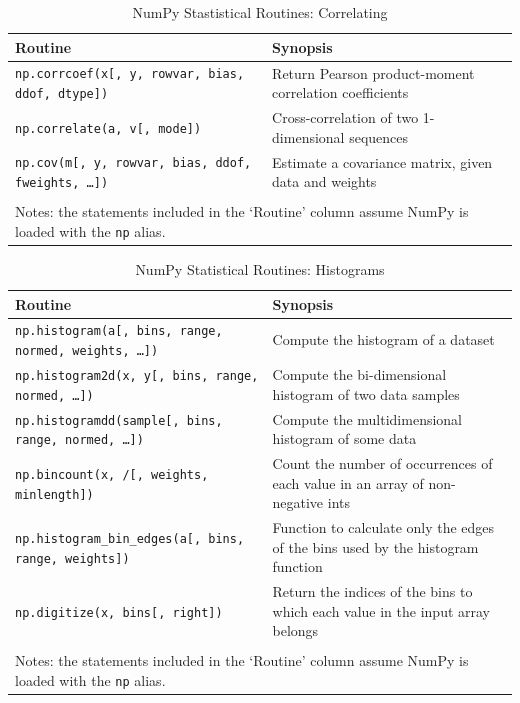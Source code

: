 \documentclass[a4paper,11pt]{book}
\begin{document}
\begin{table}
	\centering
	\caption{NumPy Stastistical Routines: Correlating}
	\label{tab:correlating}
	\begin{tabular}{ll}
		\toprule \toprule
			Routine & Synopsis \\
			\midrule
                        \texttt{np.corrcoef(x[, y, rowvar, bias, ddof, dtype])}&
                        Return Pearson product-moment correlation coefficients\\
                        \texttt{np.correlate(a, v[, mode])}&
                        Cross-correlation of two 1-dimensional sequences\\
                        \texttt{np.cov(m[, y, rowvar, bias, ddof, fweights, \ldots])}&
                        Estimate a covariance matrix, given data and weights\\
                        \bottomrule \\[-1.8ex]
	        \multicolumn{2}{l}{Notes: the statements included in the `Routine' column assume NumPy is loaded with the \texttt{np} alias.} \\
	\end{tabular}
\end{table}

\begin{table}
	\centering
	\caption{NumPy Statistical Routines: Histograms}
	\label{tab:histograms}
	\begin{tabular}{ll}
		\toprule \toprule
			Routine & Synopsis \\
			\midrule
                        \texttt{np.histogram(a[, bins, range, normed, weights, \ldots])}&
                        Compute the histogram of a dataset\\
                        \texttt{np.histogram2d(x, y[, bins, range, normed, \ldots])}&
                        Compute the bi-dimensional histogram of two data samples\\
                        \texttt{np.histogramdd(sample[, bins, range, normed, \ldots])}&
                        Compute the multidimensional histogram of some data\\
                        \texttt{np.bincount(x, /[, weights, minlength])}&
                        Count the number of occurrences of each value in an array of non-negative ints\\
                        \texttt{np.histogram\_bin\_edges(a[, bins, range, weights])}&
                        Function to calculate only the edges of the bins used by the histogram function\\
                        \texttt{np.digitize(x, bins[, right])}&
                        Return the indices of the bins to which each value in the input array belongs\\
	     	\bottomrule \\[-1.8ex]
	        \multicolumn{2}{l}{Notes: the statements included in the `Routine' column assume NumPy is loaded with the \texttt{np} alias.} \\
	\end{tabular}
\end{table}
\end{document}
